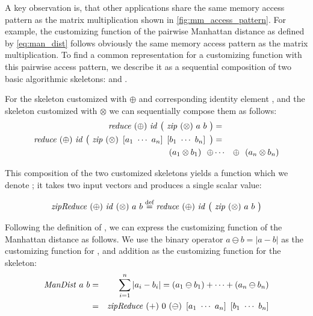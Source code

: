 A key observation is, that other applications share the same memory access pattern as the matrix multiplication shown in \autoref{fig:mm_access_pattern}.
For example, the customizing function of the pairwise Manhattan distance as defined by \autoref{eq:man_dist} follows obviously the same memory access pattern as the matrix multiplication.
To find a common representation for a customizing function with this pairwise access pattern, we describe it as a sequential composition of two basic algorithmic skeletons: \zip and \reduce.

For the \reduce skeleton customized with $\oplus$ and corresponding identity element \id, and the \zip skeleton customized with $\otimes$ we can sequentially compose them as follows:
\begin{eqnarray*}
  \reduce\ (\oplus)\ \id\ \big(\ \zip\ (\otimes)\ a\ b\ \big) &=&\\
  \reduce\ (\oplus)\ \id\ \big(\ \zip\ (\otimes)\ \DottedVector{a_1}{a_n}\ \DottedVector{b_1}{b_n}\ \big) &=&\\
  (a_1 \otimes b_1)\ \ \oplus &\cdots& \oplus\ \ (a_n \otimes b_n)
\end{eqnarray*}

This composition of the two customized skeletons yields a function which we denote \zipReduce; it takes two input vectors and produces a single scalar value:

\begin{equation*}
  \zipReduce\ (\oplus)\ \id\ (\otimes)\ a\ b \eqdef 
  \reduce\ (\oplus)\ \id\ \big(\ \zip\ (\otimes)\ a\ b\ \big)
\end{equation*}

Following the definition of \zipReduce, we can express the customizing function of the Manhattan distance as follows.
We use the binary operator $a \ominus b = |a - b|$ as the customizing function for \zip, and addition as the customizing function for the \reduce skeleton:
\begin{eqnarray*}
    \ManDist\ a\ b &=& \sum_{i=1}^{n} | a_i - b_i | = (a_1 \ominus b_1) + \cdots + (a_n \ominus b_n)\\
    &=& \zipReduce\ (+)\ 0\ (\ominus)\ \DottedVector{a_1}{a_n}\ \DottedVector{b_1}{b_n}
\end{eqnarray*}

